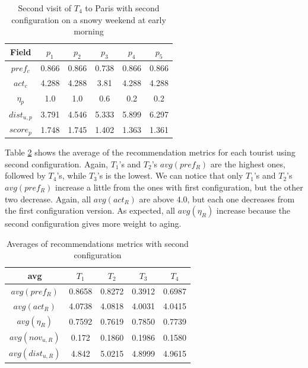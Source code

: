 \begin{table}[h!]
    \centering
    \begin{tabular}{ |c|c|c|c|c|c| } 
        \hline
        Field   & $p_1$ & $p_2$ & $p_3$ & $p_4$ & $p_5$ \\
        \hline
        $pref_c$    &  0.866 & 0.866 & 0.738 & 0.866 & 0.866 \\
        $act_c$     & 4.288 & 4.288 & 3.81 & 4.288 & 4.288  \\
        $\eta_p$    & 1.0 & 1.0 & 0.6 & 0.2 & 0.2 \\
        $dist_{u,p}$ & 3.791 & 4.546 & 5.333 & 5.899 & 6.297 \\
        $score_p$    & 1.748 & 1.745 & 1.402 & 1.363 & 1.361 \\
        
        \hline
    \end{tabular}
    \caption{Second visit of $T_4$ to Paris with second configuration on a snowy weekend at early morning}
    \label{table:2nd-t4-Paris-2}
\end{table}

Table \ref{table:config-2} shows the average of the recommendation metrics for each tourist using second configuration. Again, $T_1$'s and $T_2$'s $avg(pref_R)$ are the highest ones, followed by $T_4$'s, while $T_3$'s is the lowest. We can notice that only $T_1$'s and $T_2$'s $avg(pref_R)$ increase a little from the ones with first configuration, but the other two decrease. Again, all $avg(act_R)$ are above $4.0$, but each one decreases from the first configuration version. As expected, all $avg(\eta_R)$ increase because the second configuration gives more weight to aging.

\begin{table}[h!]
    \centering
    \begin{tabular}{ |c|c|c|c|c| } 
        \hline
        avg & $T_1$ & $T_2$ & $T_3$ & $T_4$ \\
        \hline
        \hline
        $avg(pref_R)$ & 0.8658 & 0.8272 & 0.3912 & 0.6987 \\
        $avg(act_R)$ & 4.0738 & 4.0818 & 4.0031 & 4.0415 \\
        $avg(\eta_R)$ & 0.7592 & 0.7619 & 0.7850 & 0.7739 \\
        $avg(nov_{u,R})$ & 0.172 & 0.1860 & 0.1986 & 0.1580 \\
        $avg(dist_{u,R})$ & 4.842 & 5.0215 & 4.8999 & 4.9615 \\
       
        \hline
    \end{tabular}
    \caption{Averages of recommendations metrics with second configuration}
    \label{table:config-2}
\end{table}

